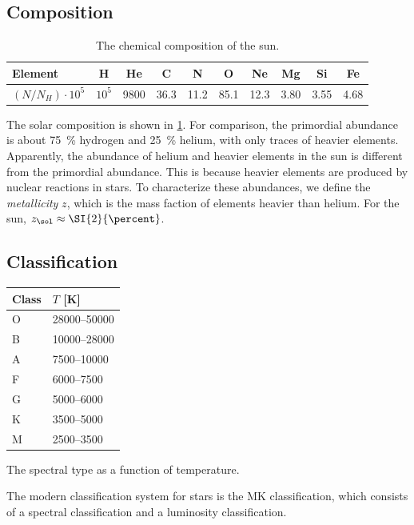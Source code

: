 \subsection{Composition}
\begin{table}
	\begin{tabular}{lccccccccc}
	\toprule
	Element & H & He & C & N & O & Ne & Mg & Si & Fe\\
	\midrule
	$(N/N_H) \cdot 10^5$ & $10^5$ & 9800 & 36.3 & 11.2 & 85.1 & 12.3 & 3.80 & 3.55 & 4.68\\
	\bottomrule
	\end{tabular}
	\caption{The chemical composition of the sun.}
	\label{tab:solar-comp}
\end{table}
The solar composition is shown in \cref{tab:solar-comp}.
For comparison, the primordial abundance is about \SI{75}{\percent} hydrogen and \SI{25}{\percent} helium, with only traces of heavier elements.
Apparently, the abundance of helium and heavier elements in the sun is different from the primordial abundance.
This is because heavier elements are produced by nuclear reactions in stars.
To characterize these abundances, we define the \emph{metallicity} $z$, which is the mass faction of elements heavier than helium.
For the sun, $z_\sol \approx \SI{2}{\percent}$.

\subsection{Classification}
\begin{margintable}
	\begin{tabular}{ll}
		\toprule
		Class & $T$ [K]\\
		\midrule
		O & \num{28000}--\num{50000}\\
		B & \num{10000}--\num{28000}\\
		A & \num{7500}--\num{10000}\\
		F & \num{6000}--\num{7500}\\
		G & \num{5000}--\num{6000}\\
		K & \num{3500}--\num{5000}\\
		M & \num{2500}--\num{3500}\\
		\bottomrule
	\end{tabular}
	\caption{The spectral type as a function of temperature.}
	\label{tab:spectral-type}
\end{margintable}
The modern classification system for stars is the MK classification, which consists of a spectral classification and a luminosity classification.


